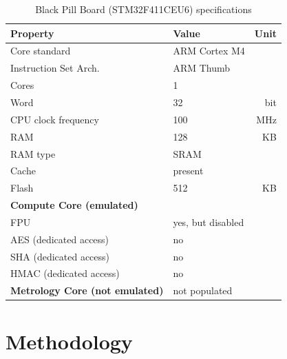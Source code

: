 \documentclass[english]{tudscrartcl}
\begin{document}
			\begin{table}[ht]
				\centering
				\begin{tabularx}{\textwidth}{|l|Y|r|}
					\hline
					\textbf{Property} & \textbf{Value} & \textbf{Unit} \\
					\hline
					Core standard & ARM Cortex M4 & \\
					\hline
					Instruction Set Arch. & ARM Thumb & \\
					\hline
					Cores & 1 &  \\
					\hline
					Word & 32 & bit \\
					\hline
					\ac{CPU} clock frequency & 100 & MHz \\
					\hline
					RAM & 128 & KB \\
					\hline
					RAM type & SRAM & \\
					\hline
					Cache & present & \\
					\hline
					Flash & 512 & KB \\
					\hline
					\textbf{Compute Core (emulated)} & & \\
					\hline
					FPU & yes, but disabled & \\
					\hline
					AES (dedicated access) & no & \\
					\hline
					SHA (dedicated access) & no & \\
					\hline
					HMAC (dedicated access) & no & \\
					\hline
					\textbf{Metrology Core (not emulated)} & not populated & \\
					\hline
				\end{tabularx}
				\caption{Black Pill Board (STM32F411CEU6) specifications}
				\label{tab:sm_mcu_refhw_specs}
			\end{table}
			\noindent

	\section{Methodology}
		\label{sec:meth}
\end{document}
